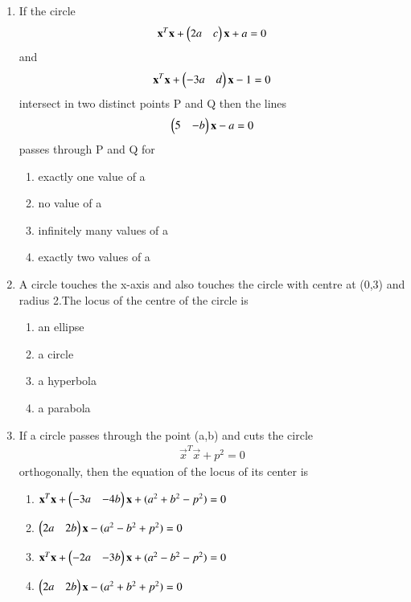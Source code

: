 \begin{enumerate}[label=\arabic*.,ref=\thesubsection.\theenumi]
\item If the circle 
\begin{align}
\mathbf x^T\mathbf x + \begin{pmatrix}2a&c\end{pmatrix}\mathbf x+a=0
\end{align} 
and 
\begin{align}
\mathbf x^T\mathbf x + \begin{pmatrix}-3a&d\end{pmatrix}\mathbf x-1=0
\end{align} 
intersect in two distinct points P and Q then the lines 
\begin{align}
\begin{pmatrix}5&-b\end{pmatrix}\mathbf x-a=0
\end{align} passes through P and Q for
\begin{enumerate}
\item exactly one value of a 
\item no value of a 
\item infinitely many values of a
\item exactly two values of a
\end{enumerate}
     
\item A circle touches the x-axis and also touches the circle with centre at (0,3) and radius 2.The locus of the centre of the circle is
\begin{enumerate}    
\item an ellipse
\item a circle 
\item a hyperbola
\item a parabola
\end{enumerate}
    
\item If a circle passes through the point (a,b) and cuts the circle  
\begin{align}
\vec x^T\vec x +p^2=0
\end{align} 
orthogonally, then the equation of the locus of its center is
\begin{enumerate}    
\item $\mathbf x^T\mathbf x + \begin{pmatrix}-3a&-4b\end{pmatrix}\mathbf x+(a^2+b^2-p^2)=0$
\item $\begin{pmatrix}2a&2b\end{pmatrix}\mathbf x-(a^2-b^2+p^2)=0$
\item $\mathbf x^T\mathbf x + \begin{pmatrix}-2a&-3b\end{pmatrix}\mathbf x+(a^2-b^2-p^2)=0$
\item $\begin{pmatrix}2a&2b\end{pmatrix}\mathbf x-(a^2+b^2+p^2)=0$
\end{enumerate}
    

\end{enumerate}
